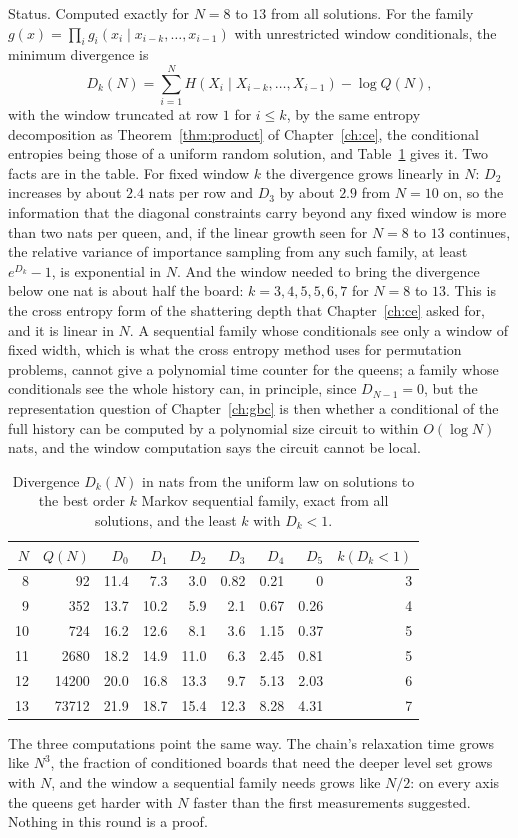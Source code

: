 Status. Computed exactly for $N = 8$ to $13$ from all solutions. For the family $g(x) = \prod_i g_i(x_i \mid x_{i-k}, \dots, x_{i-1})$ with unrestricted window conditionals, the minimum divergence is
\[
D_k(N) = \sum_{i=1}^N H(X_i \mid X_{i-k}, \dots, X_{i-1}) - \log Q(N) ,
\]
with the window truncated at row $1$ for $i \le k$, by the same entropy decomposition as Theorem~\ref{thm:product} of Chapter~\ref{ch:ce}, the conditional entropies being those of a uniform random solution, and Table~\ref{tab:window} gives it. Two facts are in the table. For fixed window $k$ the divergence grows linearly in $N$: $D_2$ increases by about $2.4$ nats per row and $D_3$ by about $2.9$ from $N = 10$ on, so the information that the diagonal constraints carry beyond any fixed window is more than two nats per queen, and, if the linear growth seen for $N = 8$ to $13$ continues, the relative variance of importance sampling from any such family, at least $e^{D_k} - 1$, is exponential in $N$. And the window needed to bring the divergence below one nat is about half the board: $k = 3, 4, 5, 5, 6, 7$ for $N = 8$ to $13$. This is the cross entropy form of the shattering depth that Chapter~\ref{ch:ce} asked for, and it is linear in $N$. A sequential family whose conditionals see only a window of fixed width, which is what the cross entropy method uses for permutation problems, cannot give a polynomial time counter for the queens; a family whose conditionals see the whole history can, in principle, since $D_{N-1} = 0$, but the representation question of Chapter~\ref{ch:gbc} is then whether a conditional of the full history can be computed by a polynomial size circuit to within $O(\log N)$ nats, and the window computation says the circuit cannot be local.

\begin{table}[t]
\centering
\small
\caption{Divergence $D_k(N)$ in nats from the uniform law on solutions to the best order $k$ Markov sequential family, exact from all solutions, and the least $k$ with $D_k < 1$.}
\label{tab:window}
\begin{tabular}{rrrrrrrrr}
\toprule
$N$ & $Q(N)$ & $D_0$ & $D_1$ & $D_2$ & $D_3$ & $D_4$ & $D_5$ & $k(D_k < 1)$ \\
\midrule
8 & 92 & 11.4 & 7.3 & 3.0 & 0.82 & 0.21 & 0 & 3 \\
9 & 352 & 13.7 & 10.2 & 5.9 & 2.1 & 0.67 & 0.26 & 4 \\
10 & 724 & 16.2 & 12.6 & 8.1 & 3.6 & 1.15 & 0.37 & 5 \\
11 & 2680 & 18.2 & 14.9 & 11.0 & 6.3 & 2.45 & 0.81 & 5 \\
12 & 14200 & 20.0 & 16.8 & 13.3 & 9.7 & 5.13 & 2.03 & 6 \\
13 & 73712 & 21.9 & 18.7 & 15.4 & 12.3 & 8.28 & 4.31 & 7 \\
\bottomrule
\end{tabular}
\end{table}

The three computations point the same way. The chain's relaxation time grows like $N^3$, the fraction of conditioned boards that need the deeper level set grows with $N$, and the window a sequential family needs grows like $N / 2$: on every axis the queens get harder with $N$ faster than the first measurements suggested. Nothing in this round is a proof.
